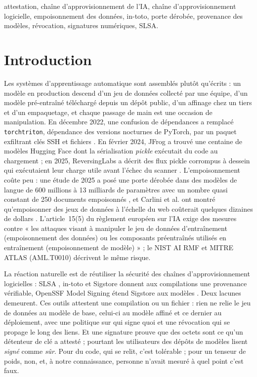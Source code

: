 \documentclass[conference]{IEEEtran}
\begin{document}
\begin{IEEEkeywords}
attestation, chaîne d'approvisionnement de l'IA, chaîne d'approvisionnement logicielle, empoisonnement des données, in-toto, porte dérobée, provenance des modèles, révocation, signatures numériques, SLSA.
\end{IEEEkeywords}

\section{Introduction}
Les systèmes d'apprentissage automatique sont assemblés plutôt qu'écrits : un modèle en production descend d'un jeu de données collecté par une équipe, d'un modèle pré-entraîné téléchargé depuis un dépôt public, d'un affinage chez un tiers et d'un empaquetage, et chaque passage de main est une occasion de manipulation. En décembre 2022, une confusion de dépendances a remplacé \texttt{torchtriton}, dépendance des versions nocturnes de PyTorch, par un paquet exfiltrant clés SSH et fichiers \cite{pytorch2022}. En février 2024, JFrog a trouvé une centaine de modèles Hugging Face dont la sérialisation \emph{pickle} exécutait du code au chargement \cite{jfrog2024} ; en 2025, ReversingLabs a décrit des flux pickle corrompus à dessein qui exécutaient leur charge utile avant l'échec du scanner \cite{rl2025}. L'empoisonnement coûte peu : une étude de 2025 a posé une porte dérobée dans des modèles de langue de 600 millions à 13 milliards de paramètres avec un nombre quasi constant de 250 documents empoisonnés \cite{souly2025}, et Carlini et al. ont montré qu'empoisonner des jeux de données à l'échelle du web coûterait quelques dizaines de dollars \cite{carlini2024}. L'article~15(5) du règlement européen sur l'IA exige des mesures contre « les attaques visant à manipuler le jeu de données d'entraînement (empoisonnement des données) ou les composants préentraînés utilisés en entraînement (empoisonnement de modèle) » \cite{aiact2024} ; le NIST AI RMF \cite{nistairmf} et MITRE ATLAS (AML.T0010) \cite{atlas} décrivent le même risque.

La réaction naturelle est de réutiliser la sécurité des chaînes d'approvisionnement logicielles : SLSA \cite{slsa11}, in-toto \cite{intoto2019} et Sigstore \cite{sigstore2022} donnent aux compilations une provenance vérifiable, OpenSSF Model Signing étend Sigstore aux modèles \cite{oms2025}. Deux lacunes demeurent. Ces outils attestent une compilation ou un fichier : rien ne relie le jeu de données au modèle de base, celui-ci au modèle affiné et ce dernier au déploiement, avec une politique sur qui signe quoi et une révocation qui se propage le long des liens. Et une signature prouve que des octets sont ce qu'un détenteur de clé a attesté ; pourtant les utilisateurs des dépôts de modèles lisent \emph{signé} comme \emph{sûr}. Pour du code, qui se relit, c'est tolérable ; pour un tenseur de poids, non, et, à notre connaissance, personne n'avait mesuré à quel point c'est faux.
\end{document}
